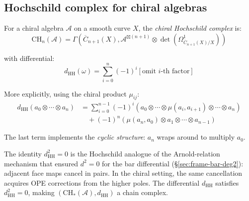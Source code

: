 \subsection{Hochschild complex for chiral algebras}

\begin{definition}
\label{def:chiral-hochschild}
For a chiral algebra $\mathcal{A}$ on a smooth curve $X$, the \emph{chiral
Hochschild complex} is:
\[\text{CH}_n(\mathcal{A}) = \Gamma\left(\overline{C}_{n+1}(X), 
   \mathcal{A}^{\boxtimes(n+1)} \otimes \det\left(\Omega^1_{\overline{C}_{n+1}(X)/X}\right)\right)\]

with differential:
\[d_{\text{HH}}(\omega) = \sum_{i=0}^{n} (-1)^i \left[\text{omit } i\text{-th factor}\right]\]

More explicitly, using the chiral product $\mu_{ij}$:
\begin{align*}
d_{\text{HH}}(a_0 \otimes \cdots \otimes a_n) 
&= \sum_{i=0}^{n-1} (-1)^i (a_0 \otimes \cdots \otimes \mu(a_i, a_{i+1}) 
   \otimes \cdots \otimes a_n) \\
&\quad + (-1)^n (\mu(a_n, a_0) \otimes a_1 \otimes \cdots \otimes a_{n-1})
\end{align*}

The last term implements the \emph{cyclic structure}: $a_n$ wraps around to multiply $a_0$.
\end{definition}

\begin{theorem}
\label{thm:hochschild-chain-complex}
The identity $d_{\text{HH}}^2 = 0$ is the Hochschild analogue of the Arnold-relation mechanism that ensured $d^2 = 0$ for the bar differential (\S\ref{sec:frame-bar-deg2}): adjacent face maps cancel in pairs.  In the chiral setting, the same cancellation acquires OPE corrections from the higher poles.
The differential $d_{\text{HH}}$ satisfies $d_{\text{HH}}^2 = 0$, making
$(\text{CH}_*(\mathcal{A}), d_{\text{HH}})$ a chain complex.
\end{theorem}

